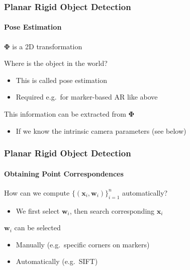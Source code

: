 \documentclass[xetex,professionalfont]{beamer}
\renewcommand{\vec}[1]{\ensuremath{\mathbf{#1}}}
\newcommand{\vw}{\vec{w}}
\newcommand{\vx}{\vec{x}}
\renewcommand\emph[1]{\textcolor{tuwcvl_inf_red}{#1}}
\begin{document}
\begin{frame}
\frametitle{Planar Rigid Object Detection}
\framesubtitle{Pose Estimation}

$\boldsymbol{\Phi}$ is a 2D transformation

\bigskip
Where is the object in the world? %
\begin{itemize}
    \item This is called \emph{pose estimation}
    \item Required e.g.\ for marker-based AR like above
\end{itemize}

\bigskip
This information can be extracted from $\boldsymbol{\Phi}$
\begin{itemize}
    \item If we know the intrinsic camera parameters (see below) %
\end{itemize}

\end{frame}


\begin{frame}
\frametitle{Planar Rigid Object Detection}
\framesubtitle{Obtaining Point Correspondences}

How can we compute $\{(\vx_i,\vw_i)\}_{i=1}^n$ automatically?
\begin{itemize}
    \item We first select $\vw_i$, then search corresponding $\vx_i$
\end{itemize}

\bigskip
$\vw_i$ can be selected
\begin{itemize}
    \item Manually (e.g.\ specific corners on markers)
    \item Automatically (e.g.\ SIFT)
\end{itemize}

\end{frame}

\end{document}
